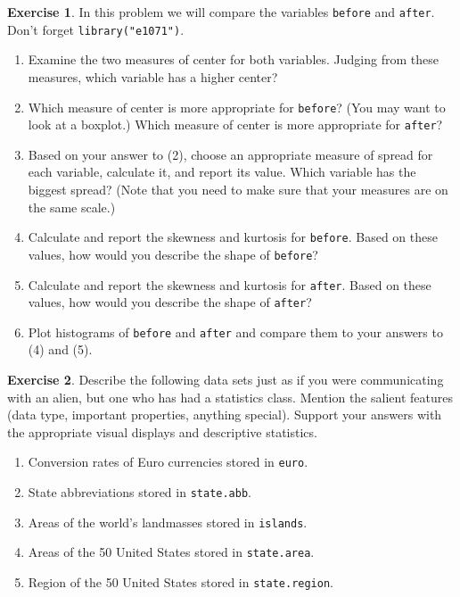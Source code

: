 \documentclass[]{book}
\providecommand{\tightlist}{%
  \setlength{\itemsep}{0pt}\setlength{\parskip}{0pt}}
\numberwithin{equation}{chapter}
\numberwithin{figure}{chapter}
\theoremstyle{plain}
\theoremstyle{definition}
\newtheorem{xca}{Exercise}[chapter]
\theoremstyle{remark}
\theoremstyle{definition}
\theoremstyle{definition}
\theoremstyle{remark}
\begin{document}
\begin{xca}
In this problem we will compare the variables \texttt{before} and
\texttt{after}. Don't forget \texttt{library("e1071")}.

\begin{enumerate}
\def\labelenumi{\arabic{enumi}.}
\tightlist
\item
  Examine the two measures of center for both variables. Judging from
  these measures, which variable has a higher center?
\item
  Which measure of center is more appropriate for \texttt{before}? (You
  may want to look at a boxplot.) Which measure of center is more
  appropriate for \texttt{after}?
\item
  Based on your answer to (2), choose an appropriate measure of spread
  for each variable, calculate it, and report its value. Which variable
  has the biggest spread? (Note that you need to make sure that your
  measures are on the same scale.)
\item
  Calculate and report the skewness and kurtosis for \texttt{before}.
  Based on these values, how would you describe the shape of
  \texttt{before}?
\item
  Calculate and report the skewness and kurtosis for \texttt{after}.
  Based on these values, how would you describe the shape of
  \texttt{after}?
\item
  Plot histograms of \texttt{before} and \texttt{after} and compare them
  to your answers to (4) and (5).
\end{enumerate}
\end{xca}

\bigskip

\begin{xca}
Describe the following data sets just as if you were communicating with
an alien, but one who has had a statistics class. Mention the salient
features (data type, important properties, anything special). Support
your answers with the appropriate visual displays and descriptive
statistics.

\begin{enumerate}
\def\labelenumi{\arabic{enumi}.}
\tightlist
\item
  Conversion rates of Euro currencies stored in \texttt{euro}.
\item
  State abbreviations stored in \texttt{state.abb}.
\item
  Areas of the world's landmasses stored in \texttt{islands}.
\item
  Areas of the 50 United States stored in \texttt{state.area}.
\item
  Region of the 50 United States stored in \texttt{state.region}.
\end{enumerate}
\end{xca}
\end{document}
